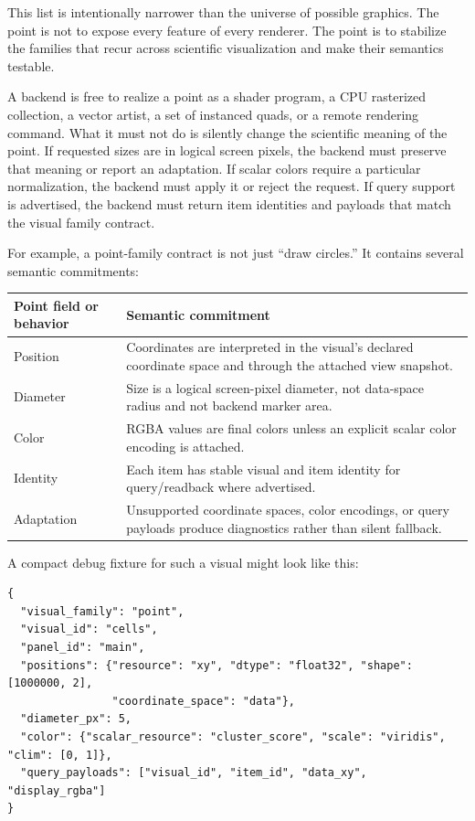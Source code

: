 \documentclass[a4paper,11pt]{article}
\begin{document}
This list is intentionally narrower than the universe of possible graphics. The point is not to
expose every feature of every renderer. The point is to stabilize the families that recur across
scientific visualization and make their semantics testable.

A backend is free to realize a point as a shader program, a CPU rasterized collection, a vector
artist, a set of instanced quads, or a remote rendering command. What it must not do is silently
change the scientific meaning of the point. If requested sizes are in logical screen pixels, the
backend must preserve that meaning or report an adaptation. If scalar colors require a particular
normalization, the backend must apply it or reject the request. If query support is advertised, the
backend must return item identities and payloads that match the visual family contract.

For example, a point-family contract is not just ``draw circles.'' It contains several semantic
commitments:

\begin{center}
\begin{tabularx}{0.92\textwidth}{@{}lX@{}}
\toprule
Point field or behavior & Semantic commitment \\
\midrule
Position & Coordinates are interpreted in the visual's declared coordinate space and through the
attached view snapshot. \\
Diameter & Size is a logical screen-pixel diameter, not data-space radius and not backend marker
area. \\
Color & RGBA values are final colors unless an explicit scalar color encoding is attached. \\
Identity & Each item has stable visual and item identity for query/readback where advertised. \\
Adaptation & Unsupported coordinate spaces, color encodings, or query payloads produce diagnostics
rather than silent fallback. \\
\bottomrule
\end{tabularx}
\end{center}

A compact debug fixture for such a visual might look like this:

\begin{lstlisting}[float=htbp,caption={Illustrative debug fixture fragment for a point visual.}]
{
  "visual_family": "point",
  "visual_id": "cells",
  "panel_id": "main",
  "positions": {"resource": "xy", "dtype": "float32", "shape": [1000000, 2],
                "coordinate_space": "data"},
  "diameter_px": 5,
  "color": {"scalar_resource": "cluster_score", "scale": "viridis", "clim": [0, 1]},
  "query_payloads": ["visual_id", "item_id", "data_xy", "display_rgba"]
}
\end{lstlisting}
\end{document}
